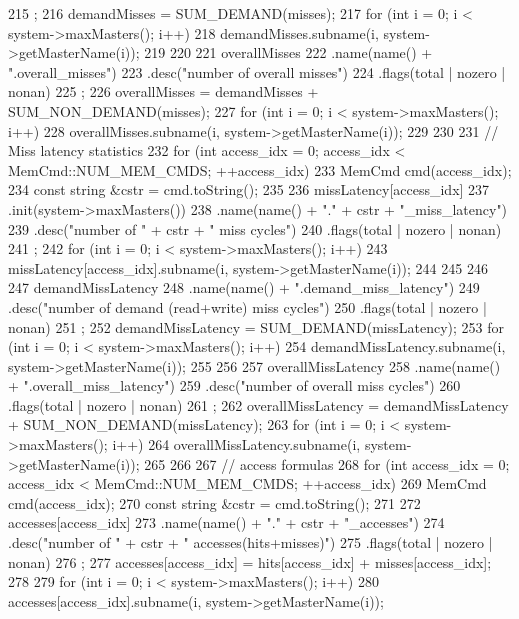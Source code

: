 \begin{DoxyCode}
{215         ;
216     demandMisses = SUM_DEMAND(misses);
217     for (int i = 0; i < system->maxMasters(); i++) {
218         demandMisses.subname(i, system->getMasterName(i));
219     }
220 
221     overallMisses
222         .name(name() + ".overall_misses")
223         .desc("number of overall misses")
224         .flags(total | nozero | nonan)
225         ;
226     overallMisses = demandMisses + SUM_NON_DEMAND(misses);
227     for (int i = 0; i < system->maxMasters(); i++) {
228         overallMisses.subname(i, system->getMasterName(i));
229     }
230 
231     // Miss latency statistics
232     for (int access_idx = 0; access_idx < MemCmd::NUM_MEM_CMDS; ++access_idx) {
233         MemCmd cmd(access_idx);
234         const string &cstr = cmd.toString();
235 
236         missLatency[access_idx]
237             .init(system->maxMasters())
238             .name(name() + "." + cstr + "_miss_latency")
239             .desc("number of " + cstr + " miss cycles")
240             .flags(total | nozero | nonan)
241             ;
242         for (int i = 0; i < system->maxMasters(); i++) {
243             missLatency[access_idx].subname(i, system->getMasterName(i));
244         }
245     }
246 
247     demandMissLatency
248         .name(name() + ".demand_miss_latency")
249         .desc("number of demand (read+write) miss cycles")
250         .flags(total | nozero | nonan)
251         ;
252     demandMissLatency = SUM_DEMAND(missLatency);
253     for (int i = 0; i < system->maxMasters(); i++) {
254         demandMissLatency.subname(i, system->getMasterName(i));
255     }
256 
257     overallMissLatency
258         .name(name() + ".overall_miss_latency")
259         .desc("number of overall miss cycles")
260         .flags(total | nozero | nonan)
261         ;
262     overallMissLatency = demandMissLatency + SUM_NON_DEMAND(missLatency);
263     for (int i = 0; i < system->maxMasters(); i++) {
264         overallMissLatency.subname(i, system->getMasterName(i));
265     }
266 
267     // access formulas
268     for (int access_idx = 0; access_idx < MemCmd::NUM_MEM_CMDS; ++access_idx) {
269         MemCmd cmd(access_idx);
270         const string &cstr = cmd.toString();
271 
272         accesses[access_idx]
273             .name(name() + "." + cstr + "_accesses")
274             .desc("number of " + cstr + " accesses(hits+misses)")
275             .flags(total | nozero | nonan)
276             ;
277         accesses[access_idx] = hits[access_idx] + misses[access_idx];
278 
279         for (int i = 0; i < system->maxMasters(); i++) {
280             accesses[access_idx].subname(i, system->getMasterName(i));
}}}
\end{DoxyCode}
